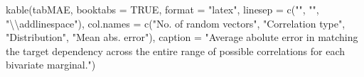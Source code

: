 \documentclass{article}
\newenvironment{Shaded}{\begin{snugshade}}{\end{snugshade}}
\newcommand{\AttributeTok}[1]{\textcolor[rgb]{0.77,0.63,0.00}{#1}}
\newcommand{\ConstantTok}[1]{\textcolor[rgb]{0.00,0.00,0.00}{#1}}
\newcommand{\FunctionTok}[1]{\textcolor[rgb]{0.00,0.00,0.00}{#1}}
\newcommand{\NormalTok}[1]{#1}
\newcommand{\SpecialCharTok}[1]{\textcolor[rgb]{0.00,0.00,0.00}{#1}}
\newcommand{\StringTok}[1]{\textcolor[rgb]{0.31,0.60,0.02}{#1}}
\begin{document}
\begin{Shaded}
\begin{Highlighting}[]
\FunctionTok{kable}\NormalTok{(tabMAE, }\AttributeTok{booktabs =} \ConstantTok{TRUE}\NormalTok{, }\AttributeTok{format =} \StringTok{"latex"}\NormalTok{,}
      \AttributeTok{linesep =} \FunctionTok{c}\NormalTok{(}\StringTok{""}\NormalTok{, }\StringTok{""}\NormalTok{, }\StringTok{"}\SpecialCharTok{\textbackslash{}\textbackslash{}}\StringTok{addlinespace"}\NormalTok{),}
      \AttributeTok{col.names =} \FunctionTok{c}\NormalTok{(}\StringTok{"No. of random vectors"}\NormalTok{,}
                    \StringTok{"Correlation type"}\NormalTok{,}
                    \StringTok{"Distribution"}\NormalTok{,}
                    \StringTok{"Mean abs. error"}\NormalTok{),}
      \AttributeTok{caption =} \StringTok{"Average abolute error in matching the target dependency across the entire range of possible correlations for each bivariate marginal."}\NormalTok{)}
\end{Highlighting}
\end{Shaded}
\end{document}
